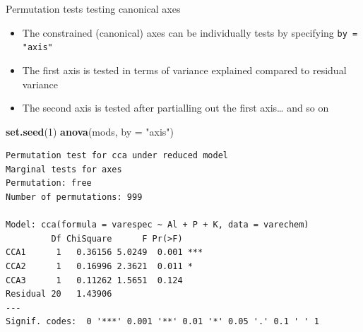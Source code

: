 \documentclass[10pt,ignorenonframetext,compress, aspectratio=169]{beamer}
\newenvironment{Shaded}{\begin{snugshade}}{\end{snugshade}}
\newcommand{\KeywordTok}[1]{\textcolor[rgb]{0.13,0.29,0.53}{\textbf{{#1}}}}
\newcommand{\DataTypeTok}[1]{\textcolor[rgb]{0.13,0.29,0.53}{{#1}}}
\newcommand{\DecValTok}[1]{\textcolor[rgb]{0.00,0.00,0.81}{{#1}}}
\newcommand{\StringTok}[1]{\textcolor[rgb]{0.31,0.60,0.02}{{#1}}}
\newcommand{\NormalTok}[1]{{#1}}
\begin{document}
\begin{frame}[fragile]{Permutation tests \textbar{} testing canonical
axes}

\begin{itemize}
\itemsep1pt\parskip0pt
\item
  The constrained (canonical) axes can be individually tests by
  specifying \texttt{by = "axis"}
\item
  The first axis is tested in terms of variance explained compared to
  residual variance
\item
  The second axis is tested after partialling out the first axis\ldots{}
  and so on
\end{itemize}

\tiny

\begin{Shaded}
\begin{Highlighting}[]
\KeywordTok{set.seed}\NormalTok{(}\DecValTok{1}\NormalTok{)}
\KeywordTok{anova}\NormalTok{(mods, }\DataTypeTok{by =} \StringTok{"axis"}\NormalTok{)}
\end{Highlighting}
\end{Shaded}

\begin{verbatim}
Permutation test for cca under reduced model
Marginal tests for axes
Permutation: free
Number of permutations: 999

Model: cca(formula = varespec ~ Al + P + K, data = varechem)
         Df ChiSquare      F Pr(>F)    
CCA1      1   0.36156 5.0249  0.001 ***
CCA2      1   0.16996 2.3621  0.011 *  
CCA3      1   0.11262 1.5651  0.124    
Residual 20   1.43906                  
---
Signif. codes:  0 '***' 0.001 '**' 0.01 '*' 0.05 '.' 0.1 ' ' 1
\end{verbatim}

\normalsize

\end{frame}
\end{document}
